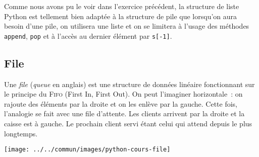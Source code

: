 \documentclass{magnolia}
\begin{document}
\vspace{2ex}
Comme nous avons pu le voir dans l'exercice précédent, la structure de liste Python
est tellement bien adaptée à la structure de pile que lorsqu'on aura besoin d'une pile, on utilisera une
liste et on se limitera à l'usage des méthodes \verb!append!, \verb!pop! et à l'accès au dernier élément
par \verb!s[-1]!.


\subsection{File}

Une \emph{file} (\emph{queue} en anglais) est une structure de données linéaire fonctionnant
sur le principe du \textsc{Fifo} (First
In, First Out). On peut l'imaginer horizontale~: on rajoute des éléments par la droite
et on les enlève par la gauche. Cette fois, l'analogie se fait avec une file
d'attente. Les clients arrivent par la droite et la caisse est à gauche. Le prochain client
servi étant celui qui attend depuis le plus longtemps.

\begin{center}
  \texttt{[image: ../../commun/images/python-cours-file]}
  \end{center}




\end{document}
